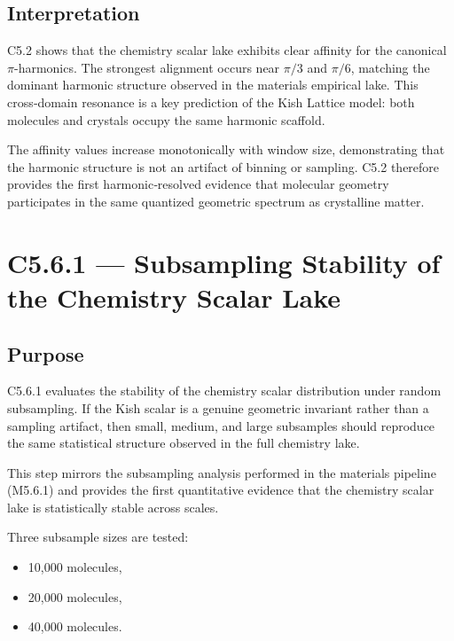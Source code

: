 \documentclass[11pt, letterpaper, openany]{book}
\begin{document}
\subsection*{Interpretation}
C5.2 shows that the chemistry scalar lake exhibits clear affinity for the
canonical \(\pi\)-harmonics. The strongest alignment occurs near \(\pi/3\) and
\(\pi/6\), matching the dominant harmonic structure observed in the materials
empirical lake. This cross‑domain resonance is a key prediction of the Kish
Lattice model: both molecules and crystals occupy the same harmonic scaffold.

The affinity values increase monotonically with window size, demonstrating that
the harmonic structure is not an artifact of binning or sampling. C5.2 therefore
provides the first harmonic‑resolved evidence that molecular geometry participates
in the same quantized geometric spectrum as crystalline matter.


\section{C5.6.1 — Subsampling Stability of the Chemistry Scalar Lake}

\subsection*{Purpose}
C5.6.1 evaluates the stability of the chemistry scalar distribution under random
subsampling. If the Kish scalar is a genuine geometric invariant rather than a
sampling artifact, then small, medium, and large subsamples should reproduce the
same statistical structure observed in the full chemistry lake.

This step mirrors the subsampling analysis performed in the materials pipeline
(M5.6.1) and provides the first quantitative evidence that the chemistry scalar
lake is statistically stable across scales.

Three subsample sizes are tested:

\begin{itemize}
    \item 10,000 molecules,
    \item 20,000 molecules,
    \item 40,000 molecules.
\end{itemize}
\end{document}
